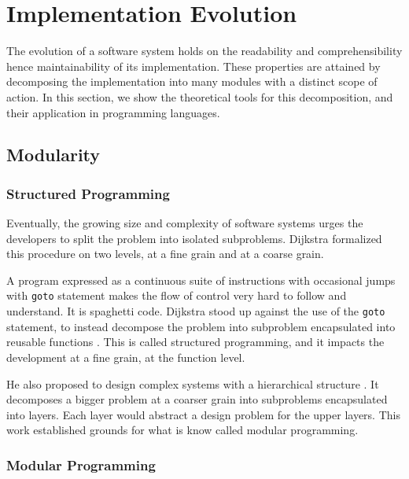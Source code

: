\section{Implementation Evolution}

The evolution of a software system holds on the readability and comprehensibility hence maintainability of its implementation.
These properties are attained by decomposing the implementation into many modules with a distinct scope of action.
In this section, we show the theoretical tools for this decomposition, and their application in programming languages.

\subsection{Modularity}

\subsubsection{Structured Programming}

Eventually, the growing size and complexity of software systems urges the developers to split the problem into isolated subproblems.
Dijkstra formalized this procedure on two levels, at a fine grain and at a coarse grain.

A program expressed as a continuous suite of instructions with occasional jumps with \texttt{goto} statement makes the flow of control very hard to follow and understand.
It is spaghetti code.
Dijkstra stood up against the use of the \texttt{goto} statement, to instead decompose the problem into subproblem encapsulated into reusable functions \cite{Dijkstra1968a}.
This is called structured programming, and it impacts the development at a fine grain, at the function level.

He also proposed to design complex systems with a hierarchical structure \cite{Dijkstra1968}.
It decomposes a bigger problem at a coarser grain into subproblems encapsulated into layers.
Each layer would abstract a design problem for the upper layers.
This work established grounds for what is know called modular programming.


\subsubsection{Modular Programming}


